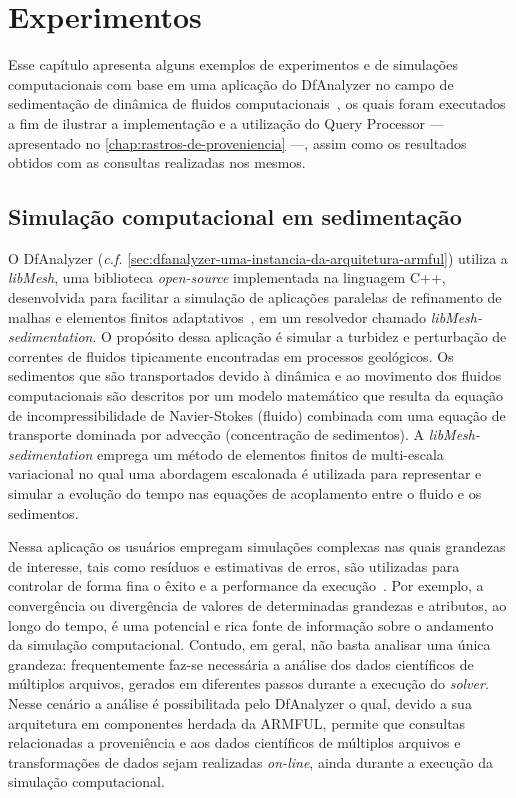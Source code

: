 
\chapter{Experimentos}%
\label{chap:experimentos}

Esse capítulo apresenta alguns exemplos de experimentos e de simulações computacionais com base em uma aplicação do DfAnalyzer no campo de sedimentação de dinâmica de fluidos computacionais~\cite{silva2016situ}, os quais foram executados a fim de ilustrar a implementação e a utilização do Query Processor --- apresentado no \autoref{chap:rastros-de-proveniencia} ---, assim como os resultados obtidos com as consultas realizadas nos mesmos.

\section{Simulação computacional em sedimentação}

O DfAnalyzer (\textit{c.f.} \autoref{sec:dfanalyzer-uma-instancia-da-arquitetura-armful}) utiliza a \textit{libMesh}, uma biblioteca \textit{open-source} implementada na linguagem C++, desenvolvida para facilitar a simulação de aplicações paralelas de refinamento de malhas e elementos finitos adaptativos~\cite{boncz2008breaking}, em um resolvedor chamado \textit{libMesh-sedimentation}. O propósito dessa aplicação é simular a turbidez e perturbação de correntes de fluidos tipicamente encontradas em processos geológicos. Os sedimentos que são transportados devido à dinâmica e ao movimento dos fluidos computacionais são descritos por um modelo matemático que resulta da equação de incompressibilidade de Navier-Stokes (fluido) combinada com uma equação de transporte dominada por advecção (concentração de sedimentos). A \textit{libMesh-sedimentation} emprega um método de elementos finitos de multi-escala variacional no qual uma abordagem escalonada é utilizada para representar e simular a evolução do tempo nas equações de acoplamento entre o fluido e os sedimentos. 

Nessa aplicação os usuários empregam simulações complexas nas quais grandezas de interesse, tais como resíduos e estimativas de erros, são utilizadas para controlar de forma fina o êxito e a performance da execução~\cite{silva2016situ}. Por exemplo, a convergência ou divergência de valores de determinadas grandezas e atributos, ao longo do tempo, é uma potencial e rica fonte de informação sobre o andamento da simulação computacional. Contudo, em geral, não basta analisar uma única grandeza: frequentemente faz-se necessária a análise dos dados científicos de múltiplos arquivos, gerados em diferentes passos durante a execução do \textit{solver}. Nesse cenário a análise é possibilitada pelo DfAnalyzer o qual, devido a sua arquitetura em componentes herdada da ARMFUL, permite que consultas relacionadas a proveniência e aos dados científicos de múltiplos arquivos e transformações de dados sejam realizadas \textit{on-line}, ainda durante a execução da simulação computacional.

